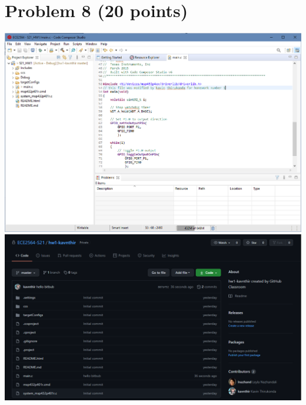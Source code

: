 \documentclass{article}
\begin{document}
\section*{Problem 8 (20 points)}
\includegraphics[width = \textwidth]{ccs.png}
\includegraphics[width = \textwidth]{github.png}
\end{document}
